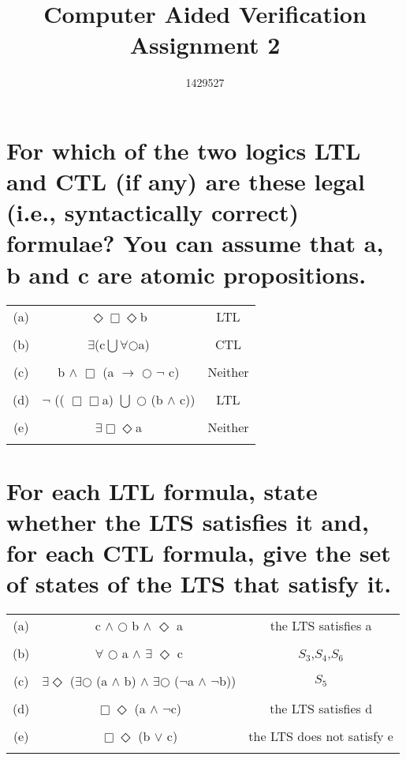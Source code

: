 \documentclass{article}
\begin{document}
\title{%
  Computer Aided Verification  \\
  \large Assignment 2 \\
    }

\author{1429527}

\maketitle

\section{For which of the two logics LTL and CTL (if any) are these legal (i.e., syntactically correct)
formulae? You can assume that a, b and c are atomic propositions.}

\begin{center}
\begin{tabular}{ c c c  } 
 
 (a) & $\Diamond$$\Box$$\Diamond$b & LTL \\ 
 \\
 (b) & $\exists$(c$\bigcup$$\forall$$\bigcirc$a) & CTL\\ 
 \\
 (c) & b $\land$ $\Box$ (a $\rightarrow$ $\bigcirc$ $\neg$ c) & Neither \\ 
 \\
 (d) & $\neg$ (( $\Box$$\Box$a) $\bigcup$ $\bigcirc$ (b $\land$ c)) & LTL\\ 
 \\
 (e) & $\exists$$\Box$$\Diamond$a & Neither\\ 
 \\
\end{tabular}
\end{center} 

\section{For each LTL formula, state whether the LTS satisfies it and, for each CTL formula, give the set
of states of the LTS that satisfy it.}

\begin{center}
\begin{tabular}{ c c c  } 
 
 (a) & c $\land$ $\bigcirc$ b $\land$ $\Diamond$ a & the LTS satisfies a \\ 
 \\
 (b) & $\forall$ $\bigcirc$ a $\land$ $\exists$ $\Diamond$ c & {$S_3$,$S_4$,$S_6$} \\ 
 \\
 (c) & $\exists$$\Diamond$ ($\exists$$\bigcirc$ (a $\land$ b) $\land$ $\exists$$\bigcirc$ ($\neg$a $\land$ $\neg$b))   & $S_5$ \\ 
 \\
 (d) & $\Box$$\Diamond$ (a $\land$ $\neg$c) & the LTS satisfies d \\ 
 \\
 (e) & $\Box$$\Diamond$ (b $\lor$ c) & the LTS does not satisfy e \\ 
 \\
\end{tabular}
\end{center} 
\end{document}
